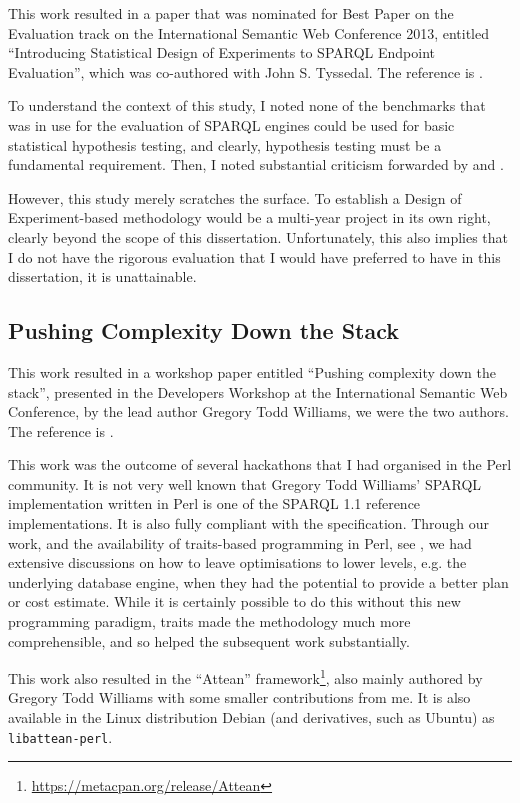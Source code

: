 This work resulted in a paper that was nominated for Best Paper on the
Evaluation track on the International Semantic Web Conference 2013,
entitled ``Introducing Statistical Design of Experiments to SPARQL
Endpoint Evaluation'', which was co-authored with John
S. Tyssedal. The reference is \cite{kjernsmo_doe_intro}.

To understand the context of this study, I noted none of the
benchmarks that was in use for the evaluation of SPARQL engines could
be used for basic statistical hypothesis testing, and clearly,
hypothesis testing must be a fundamental requirement. Then, I noted
substantial criticism forwarded by
\cite{Duan:2011:AOC:1989323.1989340} and \cite{MontoyaVCRA12}.

However, this study merely scratches the surface. To establish a
Design of Experiment-based methodology would be a multi-year project
in its own right, clearly beyond the scope of this
dissertation. Unfortunately, this also implies that I do not have the
rigorous evaluation that I would have preferred to have in this
dissertation, it is unattainable.

\subsection{Pushing Complexity Down the Stack}\label{sec:conpush}

This work resulted in a workshop paper entitled ``Pushing complexity
down the stack'', presented in the Developers Workshop at the
International Semantic Web Conference, by the lead author Gregory Todd
Williams, we were the two authors. The reference is
\cite{williamspushing}.


This work was the outcome of several hackathons that I had organised
in the Perl community. It is not very well known that Gregory Todd
Williams' SPARQL implementation written in Perl is one of the SPARQL
1.1 reference implementations. It is also fully compliant with
the specification. Through our work, and the availability of
traits-based programming in Perl, see \cite{traits}, we had extensive
discussions on how to leave optimisations to lower levels, e.g. the
underlying database engine, when they had the potential to provide a
better plan or cost estimate. While it is certainly possible to do
this without this new programming paradigm, traits made the
methodology much more comprehensible, and so helped the subsequent
work substantially.

This work also resulted in the ``Attean''
framework\footnote{\url{https://metacpan.org/release/Attean}}, also
mainly authored by Gregory Todd Williams with some smaller
contributions from me. It is also available in the Linux distribution
Debian (and derivatives, such as Ubuntu) as \texttt{libattean-perl}.

